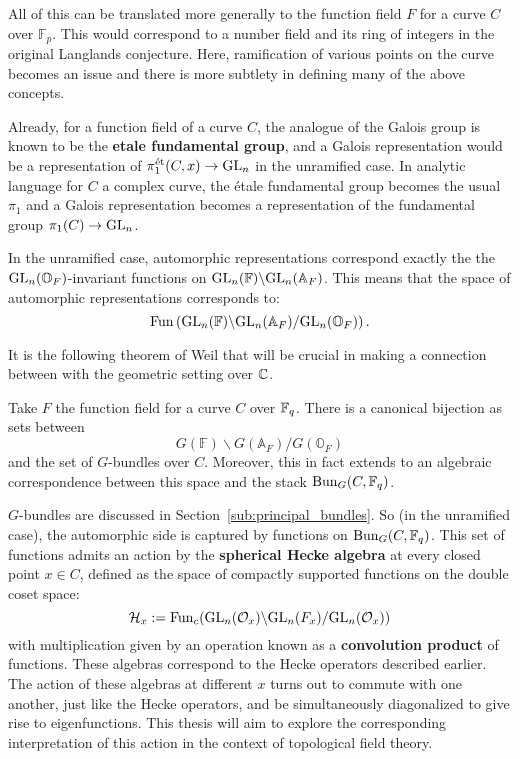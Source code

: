 All of this can be translated more generally to the function field $F$ for a curve $C$ over $\mathbb F_p$. This would correspond to a number field and its ring of integers in the original Langlands conjecture. Here, ramification of various points on the curve becomes an issue and there is more subtlety in defining many of the above concepts.

Already, for a function field of a curve $C$, the analogue of the Galois group is known to be the \textbf{etale fundamental group}, and a Galois representation would be a representation of $\pi_1^{\text{\'et}}(C,x) \to \mathrm{GL}_n$ in the unramified case. In analytic language for $C$ a complex curve, the \'etale fundamental group becomes the usual $\pi_1$ and a Galois representation becomes a representation of the fundamental group $\pi_1(C) \to \mathrm{GL}_n$. 

In the unramified case, automorphic representations correspond exactly the the $\mathrm{GL}_n(\mathbb O_F)$-invariant functions on $\mathrm{GL}_n (\mathbb F)\backslash \mathrm{GL}_n(\mathbb A_F)$. This means that the space of automorphic representations corresponds to:
\[
	\mathrm{Fun} \left(\mathrm{GL}_n (\mathbb F)\backslash \mathrm{GL}_n(\mathbb A_F)/\mathrm{GL}_n(\mathbb O_F) \right).
\]

It is the following theorem of Weil that will be crucial in making a connection between with the geometric setting over $\mathbb{C}$.
\begin{theorem}
	Take $F$ the function field for a curve $C$ over $\mathbb{F}_q$. There is a canonical bijection as sets between
	\[
		G (\mathbb F)\backslash G(\mathbb A_F)/G(\mathbb O_F)
	\]
	and the set of $G$-bundles over $C$. Moreover, this in fact extends to an algebraic correspondence between this space and the stack $\mathrm{Bun}_G(C, \mathbb{F}_q)$. 
\end{theorem}

$G$-bundles are discussed in Section~\ref{sub:principal_bundles}.
So (in the unramified case), the automorphic side is captured by functions on $\mathrm{Bun}_G(C, \mathbb{F}_q)$. 
This set of functions admits an action by the \textbf{spherical Hecke algebra} at every closed point $x \in C$, defined as the space of compactly supported functions on the double coset space:
\[
	\mathcal H_x := \mathrm{Fun}_c (\mathrm{GL}_n (\mathcal O_x)\backslash \mathrm{GL}_n(F_x)/\mathrm{GL}_n(\mathcal O_x))
\]
with multiplication given by an operation known as a \textbf{convolution product} of functions. These algebras correspond to the Hecke operators described earlier. The action of these algebras at different $x$ turns out to commute with one another, just like the Hecke operators, and be simultaneously diagonalized to give rise to eigenfunctions. This thesis will aim to explore the corresponding interpretation of this action in the context of topological field theory.

